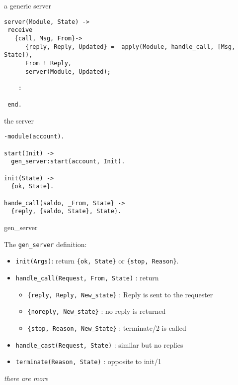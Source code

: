 \begin{frame}[fragile]{a generic server}

\begin{verbatim}
server(Module, State) ->
 receive
   {call, Msg, From}->
      {reply, Reply, Updated} =  apply(Module, handle_call, [Msg, State]),
      From ! Reply,
      server(Module, Updated);

    :

 end.           
\end{verbatim}

\end{frame}

\begin{frame}[fragile]{the server}
\begin{verbatim}
-module(account).

start(Init) ->
  gen_server:start(account, Init).

init(State) ->
  {ok, State}.

hande_call(saldo, _From, State} ->
  {reply, {saldo, State}, State}.

\end{verbatim}

\end{frame}

\begin{frame}{gen\_server}

The {\tt gen\_server} definition:

\begin{itemize}
\item {\tt init(Args)}: return {\tt \{ok, State\}} or {\tt \{stop, Reason\}}.
\pause
\item {\tt handle\_call(Request, From, State)} : return 
 \begin{itemize} 
  \item {\tt \{reply, Reply, New\_state\}} : Reply is sent to the requester
\pause
  \item {\tt \{noreply, New\_state\}} : no reply is returned
\pause
  \item {\tt \{stop, Reason, New\_State\}} :  terminate/2 is called
 \end{itemize}
\pause
\item {\tt handle\_cast(Request, State)} : similar but no replies
\pause
\item {\tt terminate(Reason, State)} : opposite to init/1
\end{itemize}

\pause\vspace{20pt}
{\em there are more}

\end{frame}

